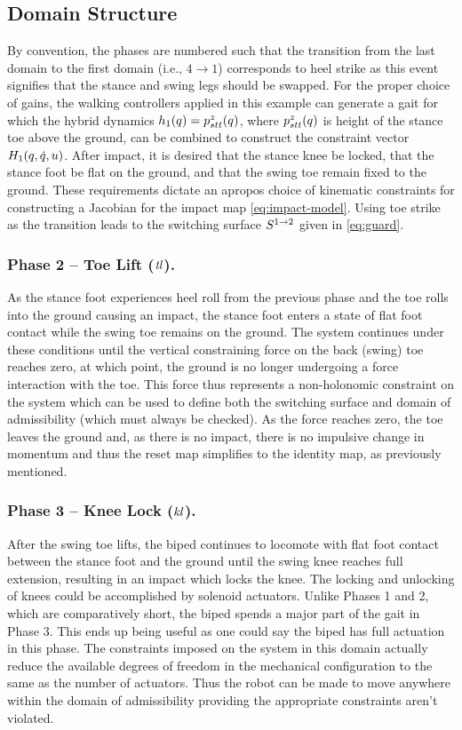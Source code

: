 \subsection{Domain Structure}

By convention, the phases are numbered such that the transition from the last
domain to the first domain (i.e., $4 \to 1$) corresponds to heel strike as this
event signifies that the stance and swing legs should be swapped.\xspace
% 
For the proper choice of gains, the walking controllers applied in this example
can generate a gait for which the hybrid dynamics $h_{1}(q) = p_{stt}^{z}(q)$,
where $p_{stt}^{z}(q)$ is height of the stance toe above the ground, can be
combined to construct the constraint vector $H_{1}(q, \dot{q}, u)$. 
% 
After impact, it is desired that the stance knee be locked, that the stance foot
be flat on the ground, and that the swing toe remain fixed to the ground.
% 
These requirements dictate an apropos choice of kinematic constraints for
constructing a Jacobian for the impact map \eqref{eq:impact-model}.
% 
Using toe strike as the transition leads to the switching surface
$S^{1 \to 2}$ given in \eqref{eq:guard}.
% 

\subsubsection{Phase 2 -- Toe Lift ($\mathit{tl}$).}
% 
As the stance foot experiences heel roll from the previous phase and the toe
rolls into the ground causing an impact, the stance foot enters a state of flat
foot contact while the swing toe remains on the ground.
% 
The system continues under these conditions until the vertical constraining
force on the back (swing) toe reaches zero, at which point, the ground is no
longer undergoing a force interaction with the toe.
% 
This force thus represents a non-holonomic constraint on the system which can be
used to define both the switching surface and domain of admissibility (which
must always be checked).
% 
As the force reaches zero, the toe leaves the ground and, as there is no impact,
there is no impulsive change in momentum and thus the reset map simplifies to
the identity map, as previously mentioned.

\subsubsection{Phase 3 -- Knee Lock ($\mathit{kl}$).}
% 
After the swing toe lifts, the biped continues to locomote with flat foot
contact between the stance foot and the ground until the swing knee reaches full
extension, resulting in an impact which locks the knee.
% 
The locking and unlocking of knees could be accomplished by solenoid actuators.
% 
Unlike Phases 1 and 2, which are comparatively short, the biped spends a major
part of the gait in Phase 3.
% 
This ends up being useful as one could say the biped has full actuation in this
phase.
% 
The constraints imposed on the system in this domain actually reduce the
available degrees of freedom in the mechanical configuration to the same as the
number of actuators.
% 
Thus the robot can be made to move anywhere within the domain of admissibility
providing the appropriate constraints aren't violated.

